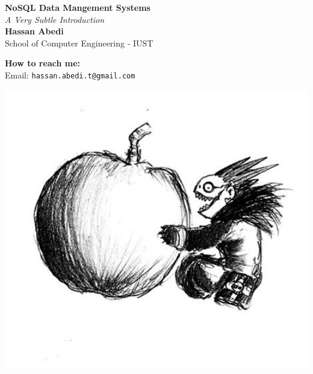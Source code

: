 \documentclass[a0,landscape]{a0poster}
\begin{document}
\noindent


\begin{minipage}[b]{0.55\linewidth}
\veryHuge \color{NavyBlue} \textbf{NoSQL Data Mangement Systems} \color{Black}\\ %
\Huge\textit{A Very Subtle Introduction}\\[1cm] %
\huge \textbf{Hassan Abedi}\\ %
\huge School of Computer Engineering - IUST\\ %
\end{minipage}
%
\begin{minipage}[b]{0.25\linewidth}
\color{DarkSlateGray}\Large \textbf{How to reach me:}\\
Email: \texttt{hassan.abedi.t@gmail.com}\\ %
\end{minipage}
%
\begin{minipage}[b]{0.19\linewidth}
\includegraphics[width=20cm]{logo.jpg} %
\end{minipage}
\end{document}
